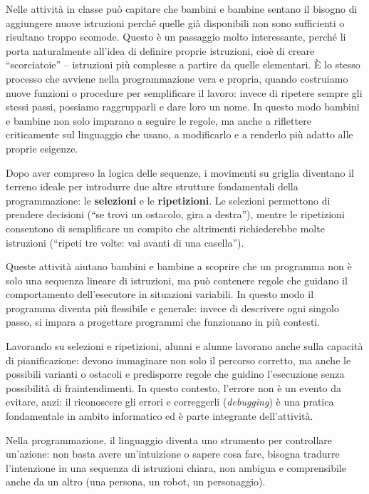 Nelle attività in classe può capitare che bambini e bambine sentano il bisogno di aggiungere nuove istruzioni perché quelle già disponibili non sono sufficienti o risultano troppo scomode. Questo è un passaggio molto interessante, perché li porta naturalmente all'idea di definire proprie istruzioni, cioè di creare ``scorciatoie'' -- istruzioni più complesse a partire da quelle elementari. È lo stesso processo che avviene nella programmazione vera e propria, quando costruiamo nuove funzioni o procedure per semplificare il lavoro: invece di ripetere sempre gli stessi passi, possiamo raggrupparli e dare loro un nome. In questo modo bambini e bambine non solo imparano a seguire le regole, ma anche a riflettere criticamente sul linguaggio che usano, a modificarlo e a renderlo più adatto alle proprie esigenze.

Dopo aver compreso la logica delle sequenze, i movimenti su griglia diventano il terreno ideale per introdurre due altre strutture fondamentali della programmazione: le \textbf{selezioni} e le \textbf{ripetizioni}. Le selezioni permettono di prendere decisioni (``se trovi un ostacolo, gira a destra''), mentre le ripetizioni consentono di semplificare un compito che altrimenti richiederebbe molte istruzioni (``ripeti tre volte: vai avanti di una casella'').

Queste attività aiutano bambini e bambine a scoprire che un programma non è solo una sequenza lineare di istruzioni, ma può contenere regole che guidano il comportamento dell'esecutore in situazioni variabili. In questo modo il programma diventa più flessibile e generale: invece di descrivere ogni singolo passo, si impara a progettare programmi che funzionano in più contesti.

Lavorando su selezioni e ripetizioni, alunni e alunne lavorano anche sulla capacità di pianificazione: devono immaginare non solo il percorso corretto, ma anche le possibili varianti o ostacoli e predisporre regole che guidino l'esecuzione senza possibilità di fraintendimenti. In questo contesto, l'errore non è un evento da evitare, anzi: il riconoscere gli errori e correggerli (\emph{debugging}) è una pratica fondamentale in ambito informatico ed è parte integrante dell'attività.

Nella programmazione, il linguaggio diventa uno strumento per controllare un'azione: non basta avere un'intuizione o sapere cosa fare, bisogna tradurre l'intenzione in una sequenza di istruzioni chiara, non ambigua e comprensibile anche da un altro (una persona, un robot, un personaggio).

